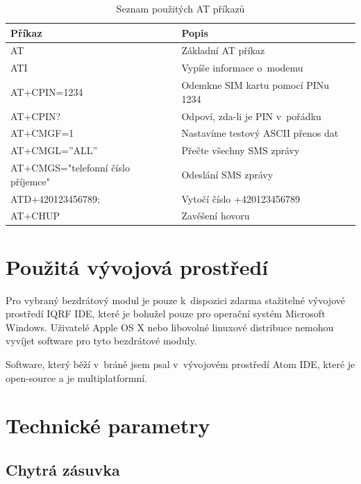 \documentclass[12pt,a4paper,oneside]{article}
\begin{document}
\begin{table}[H]
	\centering
	\begin{tabular}{|l|l|}
		\hline 
		\textbf{Příkaz} & \textbf{Popis} \\ 
		\hline 
		\hline 
		AT & Základní AT příkaz \\ 
		\hline 
		ATI & Vypíše informace o~modemu \\ 
		\hline 
		AT+CPIN=1234 & Odemkne SIM kartu pomocí PINu 1234 \\ 
		\hline 
		AT+CPIN? & Odpoví, zda-li je PIN v~pořádku \\ 
		\hline 
		AT+CMGF=1 & Nastavíme testový ASCII přenos dat \\ 
		\hline 
		AT+CMGL=”ALL” & Přečte všechny SMS zprávy \\ 
		\hline 
		AT+CMGS="telefonní číslo příjemce"& Odeslání SMS zprávy \\ 
		\hline 
		ATD+420123456789; & Vytočí číslo +420123456789 \\ 
		\hline 
		AT+CHUP & Zavěšení hovoru \\ 
		\hline 
	\end{tabular}
	\caption{Seznam použitých AT příkazů}\label{table:at-prikazy}
\end{table}

\newpage

\section{Použitá vývojová prostředí}

Pro vybraný bezdrátový modul je pouze k~dispozici zdarma stažitelné vývojové prostředí IQRF IDE, které je bohužel pouze pro operační systém Microsoft Windows. Uživatelé Apple OS X nebo libovolné linuxové distribuce nemohou vyvíjet software pro tyto bezdrátové moduly.

Software, který běží v~bráně jsem psal v~vývojovém prostředí Atom IDE, které je open-source a je multiplatformní.

\newpage

\section{Technické parametry}

\subsection{Chytrá zásuvka}
\end{document}
